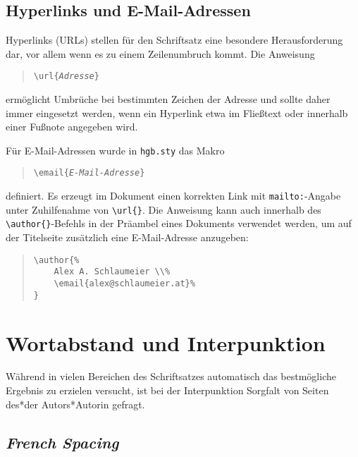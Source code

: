 \subsection{Hyperlinks und E-Mail-Adressen}

Hyperlinks (URLs) stellen für den Schriftsatz eine besondere Herausforderung dar,
vor allem wenn es zu einem Zeilenumbruch kommt. Die Anweisung 
%
\begin{quote}
	\verb!\url{!\texttt{\em Adresse}\verb!}!
\end{quote}
%
ermöglicht Umbrüche bei bestimmten Zeichen der Adresse und sollte daher immer
eingesetzt werden, wenn ein Hyperlink etwa im Fließtext oder innerhalb einer Fußnote
angegeben wird.

Für E-Mail-Adressen wurde in \texttt{hgb.sty} das Makro
%
\begin{quote}
	\verb!\email{!\texttt{\em E-Mail-Adresse}\verb!}!
\end{quote}
%
definiert. Es erzeugt im Dokument einen korrekten Link mit \texttt{mailto:}-Angabe
unter Zuhilfenahme von \verb|\url{}|. Die Anweisung kann auch innerhalb des
\verb|\author{}|-Befehls in der Präambel eines Dokuments verwendet werden,
um auf der Titelseite zusätzlich eine E-Mail-Adresse anzugeben:
%
\begin{quote}
\begin{verbatim}
\author{%
    Alex A. Schlaumeier \\%
    \email{alex@schlaumeier.at}%
}
\end{verbatim}
\end{quote}
%


\section{Wortabstand und Interpunktion}

Während \latex in vielen Bereichen des Schriftsatzes automatisch das
bestmögliche Ergebnis zu erzielen versucht, ist bei der Interpunktion
Sorgfalt von Seiten des*der Autors*Autorin gefragt.

\subsection{\emph{French Spacing}}

